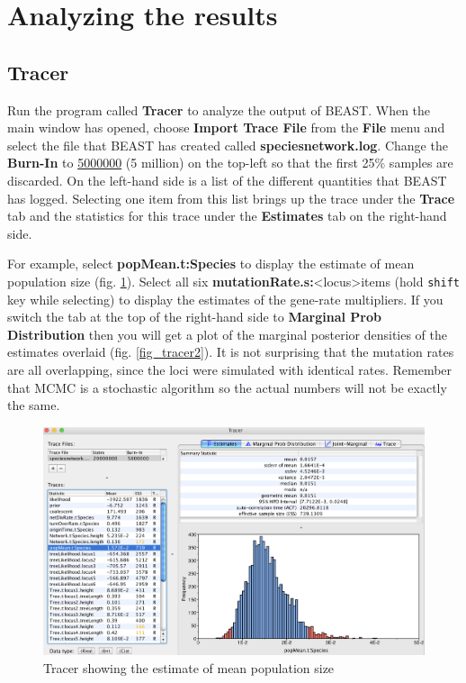 \documentclass[11pt]{article}
\begin{document}
\section*{Analyzing the results}

\subsection*{Tracer}

Run the program called \textbf{Tracer} to analyze the output of BEAST. When the main window has opened, choose \textbf{Import Trace File} from the \textbf{File} menu and select the file that BEAST has created called \textbf{speciesnetwork.log}. Change the \textbf{Burn-In} to \underline{5000000} (5 million) on the top-left so that the first 25\% samples are discarded.
On the left-hand side is a list of the different quantities that BEAST has logged. Selecting one item from this list brings up the trace under the \textbf{Trace} tab and the statistics for this trace under the \textbf{Estimates} tab on the right-hand side.

For example, select \textbf{popMean.t:Species} to display the estimate of mean population size (fig. \ref{fig_tracer1}). Select all six \textbf{mutationRate.s:}\textless{locus}\textgreater items (hold \texttt{shift} key while selecting) to display the estimates of the gene-rate multipliers. If you switch the tab at the top of the right-hand side to {\bf Marginal Prob Distribution} then you will get a plot of the marginal posterior densities of the estimates overlaid (fig. \ref{fig_tracer2}). It is not surprising that the mutation rates are all overlapping, since the loci were simulated with identical rates.
Remember that MCMC is a stochastic algorithm so the actual numbers will not be exactly the same.

\begin{figure}[h]
\center
\includegraphics[width=1.0\textwidth]{figs/fig10_tracer1.png}
\caption{Tracer showing the estimate of mean population size}
\label{fig_tracer1}
\end{figure}
\end{document}
